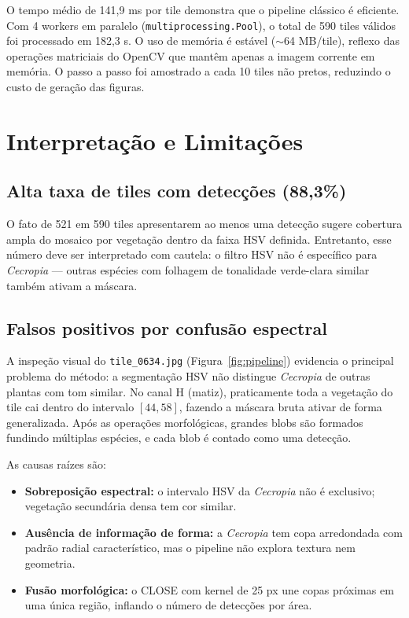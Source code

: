 \documentclass[12pt, a4paper]{article}
\begin{document}
O tempo médio de 141,9 ms por tile demonstra que o pipeline clássico é
eficiente. Com 4 workers em paralelo (\texttt{multiprocessing.Pool}), o total de
590 tiles válidos foi processado em 182,3 s. O uso de memória é estável
($\sim$64 MB/tile), reflexo das operações matriciais do OpenCV que mantêm apenas
a imagem corrente em memória. O passo a passo foi amostrado a cada 10 tiles não
pretos, reduzindo o custo de geração das figuras.

\section{Interpretação e Limitações}

\subsection{Alta taxa de tiles com detecções (88,3\%)}

O fato de 521 em 590 tiles apresentarem ao menos uma detecção sugere cobertura
ampla do mosaico por vegetação dentro da faixa HSV definida. Entretanto, esse
número deve ser interpretado com cautela: o filtro HSV não é específico para
\textit{Cecropia} — outras espécies com folhagem de tonalidade verde-clara
similar também ativam a máscara.

\subsection{Falsos positivos por confusão espectral}

A inspeção visual do \texttt{tile\_0634.jpg} (Figura~\ref{fig:pipeline})
evidencia o principal problema do método: a segmentação HSV não distingue
\textit{Cecropia} de outras plantas com tom similar. No canal H (matiz),
praticamente toda a vegetação do tile cai dentro do intervalo $[44, 58]$,
fazendo a máscara bruta ativar de forma generalizada. Após as operações
morfológicas, grandes blobs são formados fundindo múltiplas espécies, e cada
blob é contado como uma detecção.

As causas raízes são:

\begin{itemize}
    \item \textbf{Sobreposição espectral:} o intervalo HSV da \textit{Cecropia}
    não é exclusivo; vegetação secundária densa tem cor similar.
    \item \textbf{Ausência de informação de forma:} a \textit{Cecropia} tem copa
    arredondada com padrão radial característico, mas o pipeline não explora
    textura nem geometria.
    \item \textbf{Fusão morfológica:} o CLOSE com kernel de 25 px une copas
    próximas em uma única região, inflando o número de detecções por área.
\end{itemize}
\end{document}
